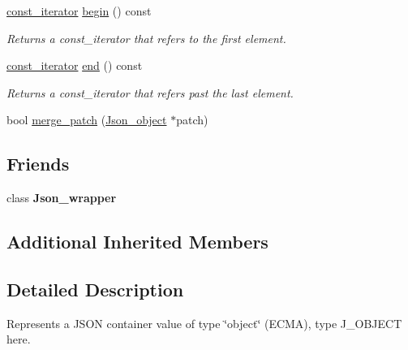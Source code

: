 \begin{DoxyCompactItemize}
\item 
\mbox{\label{classJson__object_aec4d73cdcb80930dbc984ab1b426b0da}} 
\mbox{\hyperlink{classJson__object_a318e93bc476422e10673ec7471062eca}{const\+\_\+iterator}} \mbox{\hyperlink{classJson__object_aec4d73cdcb80930dbc984ab1b426b0da}{begin}} () const
\begin{DoxyCompactList}\small\item\em Returns a const\+\_\+iterator that refers to the first element. \end{DoxyCompactList}\item 
\mbox{\label{classJson__object_a76d5b92262bd7f9239962a73df6c261a}} 
\mbox{\hyperlink{classJson__object_a318e93bc476422e10673ec7471062eca}{const\+\_\+iterator}} \mbox{\hyperlink{classJson__object_a76d5b92262bd7f9239962a73df6c261a}{end}} () const
\begin{DoxyCompactList}\small\item\em Returns a const\+\_\+iterator that refers past the last element. \end{DoxyCompactList}\item 
bool \mbox{\hyperlink{classJson__object_a0fc81386771579edb4902c2343df0677}{merge\+\_\+patch}} (\mbox{\hyperlink{classJson__object}{Json\+\_\+object}} $\ast$patch)
\end{DoxyCompactItemize}
\subsection*{Friends}
\begin{DoxyCompactItemize}
\item 
\mbox{\label{classJson__object_a98e93450f231dee2765955e5acaef3eb}} 
class {\bfseries Json\+\_\+wrapper}
\end{DoxyCompactItemize}
\subsection*{Additional Inherited Members}


\subsection{Detailed Description}
Represents a J\+S\+ON container value of type \char`\"{}object\char`\"{} (E\+C\+MA), type J\+\_\+\+O\+B\+J\+E\+CT here. 

